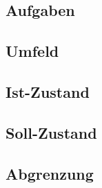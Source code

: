 \subsection{Aufgaben}

\subsection{Umfeld}

\subsection{Ist-Zustand}

\subsection{Soll-Zustand}

\subsection{Abgrenzung}